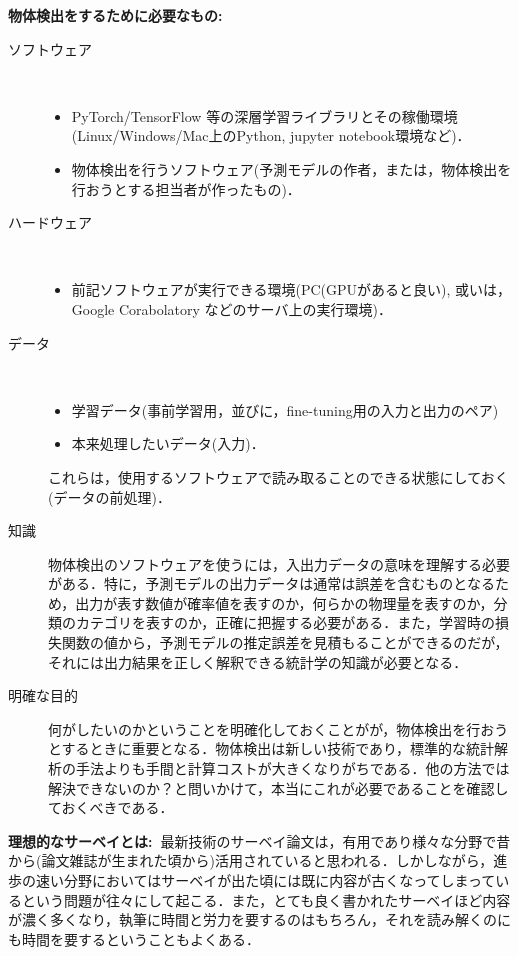 \documentclass[originalpaper,fleqn]{jsaiart}     %
\begin{document}
{\bf 物体検出をするために必要なもの:}

\begin{description}
    \item[ソフトウェア]　
    \begin{itemize}
        \item PyTorch/TensorFlow 等の深層学習ライブラリとその稼働環境(Linux/Windows/Mac上のPython, jupyter notebook環境など)．
        \item 物体検出を行うソフトウェア(予測モデルの作者，または，物体検出を行おうとする担当者が作ったもの)．
    \end{itemize}
    \item[ハードウェア]　
    \begin{itemize}
        \item 前記ソフトウェアが実行できる環境(PC(GPUがあると良い), 或いは，Google Corabolatory などのサーバ上の実行環境)．
    \end{itemize}
    \item[データ]　
    \begin{itemize}
        \item 学習データ(事前学習用，並びに，fine-tuning用の入力と出力のペア)
        \item 本来処理したいデータ(入力)．
    \end{itemize}
    これらは，使用するソフトウェアで読み取ることのできる状態にしておく(データの前処理)．
    \item[知識] 物体検出のソフトウェアを使うには，入出力データの意味を理解する必要がある．特に，予測モデルの出力データは通常は誤差を含むものとなるため，出力が表す数値が確率値を表すのか，何らかの物理量を表すのか，分類のカテゴリを表すのか，正確に把握する必要がある．また，学習時の損失関数の値から，予測モデルの推定誤差を見積もることができるのだが，それには出力結果を正しく解釈できる統計学の知識が必要となる．
    \item[明確な目的] 何がしたいのかということを明確化しておくことがが，物体検出を行おうとするときに重要となる．物体検出は新しい技術であり，標準的な統計解析の手法よりも手間と計算コストが大きくなりがちである．他の方法では解決できないのか？と問いかけて，本当にこれが必要であることを確認しておくべきである．
\end{description}

{\bf 理想的なサーベイとは:\ }最新技術のサーベイ論文は，有用であり様々な分野で昔から(論文雑誌が生まれた頃から)活用されていると思われる．しかしながら，進歩の速い分野においてはサーベイが出た頃には既に内容が古くなってしまっているという問題が往々にして起こる．また，とても良く書かれたサーベイほど内容が濃く多くなり，執筆に時間と労力を要するのはもちろん，それを読み解くのにも時間を要するということもよくある．
\end{document}

